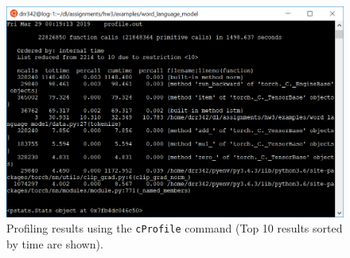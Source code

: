\documentclass{article}
\begin{document}
\begin{itemize}
	\begin{figure}[ht]
		\centering
        \includegraphics[width=1.0\linewidth]{cProfile.PNG}
		\caption{Profiling results using the \texttt{cProfile} command (Top 10 results sorted by time are shown).}
		\label{fig2}
	\end{figure}
    

\end{itemize}
\end{document}
